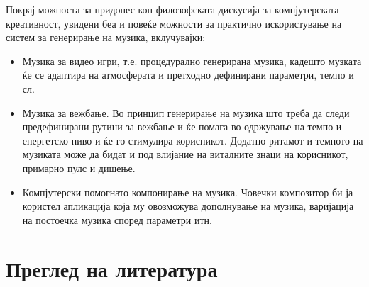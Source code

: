 Покрај можноста за придонес кон филозофската дискусија за компјутерската креативност, увидени беа и повеќе можности за практично искористување на систем за генерирање на музика, вклучувајки:
\begin{itemize}
\item Музика за видео игри, т.е. процедурално генерирана музика, кадешто музката ќе се адаптира на атмосферата и претходно дефинирани параметри, темпо и сл.
\item Музика за вежбање. Во принцип генерирање на музика што треба да следи предефинирани рутини за вежбање и ќе помага во одржување на темпо и енергетско ниво и ќе го стимулира корисникот. Додатно ритамот и темпото на музиката може да бидат и под влијание на виталните знаци на корисникот, примарно пулс и дишење.
\item Компјутерски помогнато компонирање на музика. Човечки композитор би ја користел апликација која му овозможува дополнување на музика, варијација на постоечка музика според параметри итн.
\end{itemize}

\chapter{Преглед на литература}
\label{ch:pregled}

